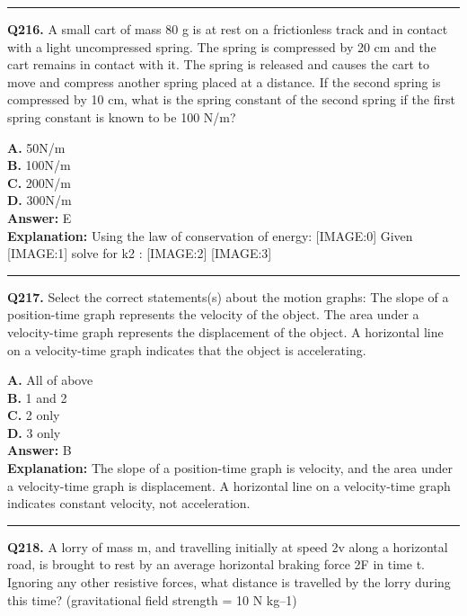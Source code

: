 \documentclass[12pt]{article}
\begin{document}
\hrule
\vspace{1em}


\noindent
\textbf{Q216.} A small cart of mass 80 g is at rest on a frictionless track and in contact with a light uncompressed spring. The spring is compressed by 20 cm and the cart remains in contact with it. The spring is released and causes the cart to move and compress another spring placed at a distance. If the second spring is compressed by 10 cm, what is the spring constant of the second spring if the first spring constant is known to be 100 N/m?



\textbf{A.} 50N/m \\
\textbf{B.} 100N/m \\
\textbf{C.} 200N/m \\
\textbf{D.} 300N/m \\

\textbf{Answer:} E \\
\textbf{Explanation:} Using the law of conservation of energy:
[IMAGE:0]
Given
[IMAGE:1]
solve for k2
:
[IMAGE:2]
[IMAGE:3]

\hrule
\vspace{1em}


\noindent
\textbf{Q217.} Select the correct statements(s) about the motion graphs:
The slope of a position-time graph represents the velocity of the object.
The area under a velocity-time graph represents the displacement of the object.
A horizontal line on a velocity-time graph indicates that the object is accelerating.



\textbf{A.} All of above \\
\textbf{B.} 1 and 2 \\
\textbf{C.} 2 only \\
\textbf{D.} 3 only \\

\textbf{Answer:} B \\
\textbf{Explanation:} The slope of a position-time graph is velocity, and the area under a velocity-time graph is displacement. A horizontal line on a velocity-time graph indicates constant velocity, not acceleration.

\hrule
\vspace{1em}


\noindent
\textbf{Q218.} A lorry of mass m, and travelling initially at speed 2v along a horizontal road, is brought to rest by an average horizontal braking force 2F in time t. Ignoring any other resistive forces, what distance is travelled by the lorry during this time? (gravitational field strength = 10 N kg–1)
\end{document}
